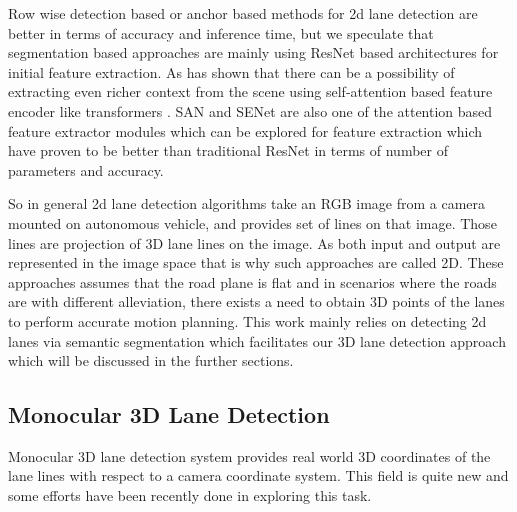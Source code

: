 Row wise detection based or anchor based methods for 2d lane detection are better in terms of accuracy and inference time, but we speculate that segmentation based approaches are mainly using ResNet\cite{DBLP:journals/corr/HeZRS15} based architectures for initial feature extraction. As \cite{DBLP:journals/corr/abs-2105-05003} has shown that there can be a possibility of extracting even richer context from the scene using self-attention based feature encoder like transformers \cite{https://doi.org/10.48550/arxiv.1706.03762}.   SAN\cite{DBLP:journals/corr/abs-2004-13621} and SENet\cite{DBLP:journals/corr/abs-1709-01507} are also one of the attention based feature extractor modules which can be explored for feature extraction which have proven to be better than traditional ResNet\cite{DBLP:journals/corr/HeZRS15} in terms of number of parameters and accuracy. 

So in general 2d lane detection algorithms take an RGB image from a camera mounted on autonomous vehicle, and provides set of lines on that image. Those lines are projection of 3D lane lines on the image. As both input and output are represented in the image space that is why such approaches are called 2D. These approaches assumes that the road plane is flat and in scenarios where the roads are with different alleviation, there exists a need to obtain 3D points of the lanes to perform accurate motion planning. This work mainly relies on detecting 2d lanes via semantic segmentation which facilitates our 3D lane detection approach which will be discussed in the further sections. 
        
        \subsection{Monocular 3D Lane Detection}
        Monocular 3D lane detection system provides real world 3D coordinates of the lane lines with respect to a camera coordinate system. This field is quite new and some efforts have been recently done in exploring this task. 
 
